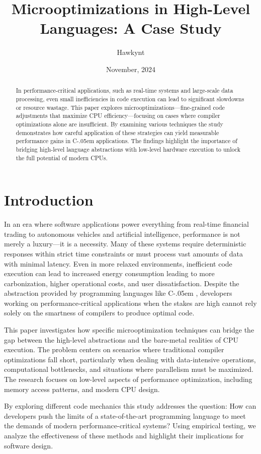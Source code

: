 \documentclass{article}
\title{Microoptimizations in High-Level Languages: A Case Study}
\author[*]{Hawkynt}
\affil[*]{Address correspondence to: hawkynt@hawkynt.de}
\date{November, 2024}
\newcommand{\Csharp}{%
  {\settoheight{\dimen0}{C}C\kern-.05em \resizebox{!}{\dimen0}{\raisebox{\depth}{\# }}}}
\begin{document}
\maketitle

\begin{abstract} 
In performance-critical applications, such as real-time systems and large-scale data processing, even small inefficiencies in code execution can lead to significant slowdowns or resource wastage. This paper explores microoptimizations—fine-grained code adjustments that maximize CPU efficiency—focusing on cases where compiler optimizations alone are insufficient. By examining various techniques the study demonstrates how careful application of these strategies can yield measurable performance gains in \Csharp applications. The findings highlight the importance of bridging high-level language abstractions with low-level hardware execution to unlock the full potential of modern CPUs.
\end{abstract}

\section{Introduction}
In an era where software applications power everything from real-time financial trading to autonomous vehicles and artificial intelligence, performance is not merely a luxury—it is a necessity. Many of these systems require deterministic responses within strict time constraints or must process vast amounts of data with minimal latency. Even in more relaxed environments, inefficient code execution can lead to increased energy consumption leading to more carbonization, higher operational costs, and user dissatisfaction. Despite the abstraction provided by programming languages like \Csharp, developers working on performance-critical applications when the stakes are high cannot rely solely on the smartness of compilers to produce optimal code.

This paper investigates how specific microoptimization techniques can bridge the gap between the high-level abstractions and the bare-metal realities of CPU execution. The problem centers on scenarios where traditional compiler optimizations fall short, particularly when dealing with data-intensive operations, computational bottlenecks, and situations where parallelism must be maximized. The research focuses on low-level aspects of performance optimization, including memory access patterns, and modern CPU design.

By exploring different code mechanics this study addresses the question: How can developers push the limits of a state-of-the-art programming language to meet the demands of modern performance-critical systems? Using empirical testing, we analyze the effectiveness of these methods and highlight their implications for software design.
\end{document}
